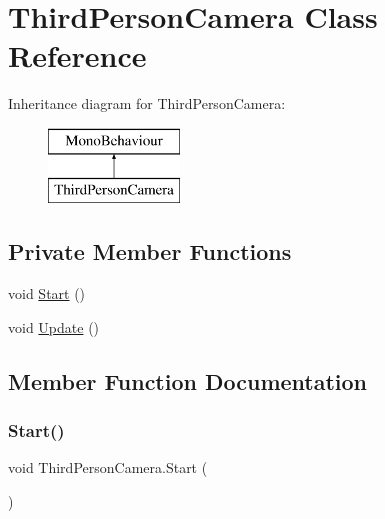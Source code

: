 \hypertarget{class_third_person_camera}{}\section{Third\+Person\+Camera Class Reference}
\label{class_third_person_camera}
Inheritance diagram for Third\+Person\+Camera\+:\begin{figure}[H]
\begin{center}
\leavevmode
\includegraphics[height=2.000000cm]{class_third_person_camera}
\end{center}
\end{figure}
\subsection*{Private Member Functions}
\begin{DoxyCompactItemize}
\item 
void \hyperlink{class_third_person_camera_a2ef6a7e16a24068ef08990e18630c047}{Start} ()
\item 
void \hyperlink{class_third_person_camera_a20036aa1bbcabcff1f0c82d18300355d}{Update} ()
\end{DoxyCompactItemize}


\subsection{Member Function Documentation}
\mbox{\label{class_third_person_camera_a2ef6a7e16a24068ef08990e18630c047}} 
\subsubsection{\texorpdfstring{Start()}{Start()}}
{\footnotesize\ttfamily void Third\+Person\+Camera.\+Start (\begin{DoxyParamCaption}{ }\end{DoxyParamCaption})\hspace{0.3cm}{\ttfamily [private]}}

\mbox{\label{class_third_person_camera_a20036aa1bbcabcff1f0c82d18300355d}} 
